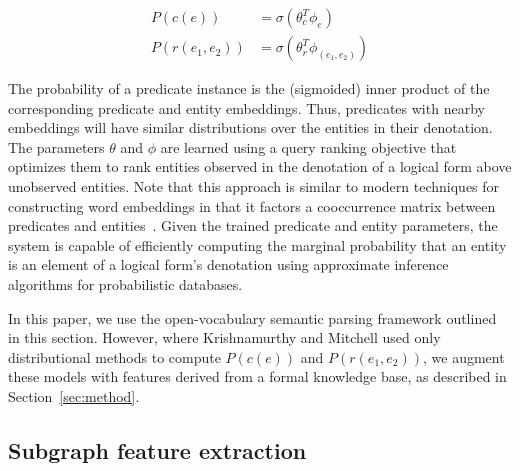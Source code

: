 \documentclass[11pt]{article}
\newcommand{\secref}[1]{Section~\ref{sec:#1}}
\begin{document}
\begin{align*}
  P(c(e)) &= \sigma ( \theta_c^T \phi_e ) \\
  P(r(e_1, e_2)) &= \sigma ( \theta_r^T \phi_{(e_1, e_2)} )
\end{align*}

The probability of a predicate instance is the (sigmoided) inner
product of the corresponding predicate and entity embeddings. Thus,
predicates with nearby embeddings will have similar distributions over
the entities in their denotation. The parameters $\theta$ and $\phi$
are learned using a query ranking objective that optimizes them to
rank entities observed in the denotation of a logical form above
unobserved entities. Note that this approach is similar to modern
techniques for constructing word embeddings in that it factors a
cooccurrence matrix between predicates and
entities~\cite{levy-2014-w2v-as-mf}. Given the trained predicate and
entity parameters, the system is capable of efficiently computing the
marginal probability that an entity is an element of a logical form's
denotation using approximate inference algorithms for probabilistic
databases.

In this paper, we use the open-vocabulary semantic parsing framework
outlined in this section.  However, where Krishnamurthy and Mitchell
used only distributional methods to compute $P(c(e))$ and $P(r(e_1,
e_2))$, we augment these models with features derived from a formal
knowledge base, as described in \secref{method}.

\subsection{Subgraph feature extraction}
\end{document}
